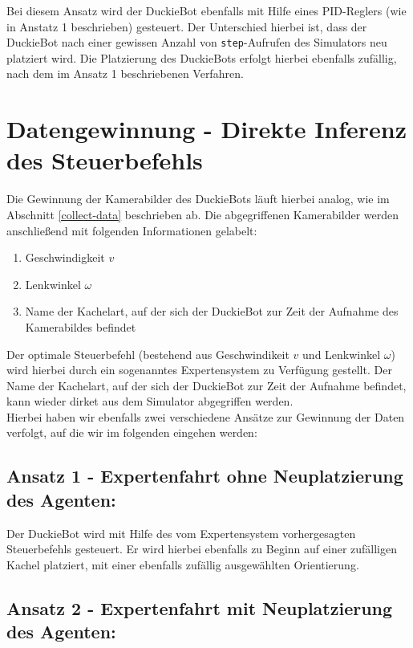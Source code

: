Bei diesem Ansatz wird der DuckieBot ebenfalls mit Hilfe eines PID-Reglers (wie in Anstatz 1 beschrieben) gesteuert. Der Unterschied hierbei ist, dass der DuckieBot nach einer gewissen Anzahl von \texttt{step}-Aufrufen des Simulators neu platziert wird. Die Platzierung des DuckieBots erfolgt hierbei ebenfalls zufällig, nach dem im Ansatz 1 beschriebenen Verfahren.

\section{Datengewinnung - Direkte Inferenz des Steuerbefehls}

Die Gewinnung der Kamerabilder des DuckieBots läuft hierbei analog, wie im Abschnitt \ref{collect-data} beschrieben ab. Die abgegriffenen Kamerabilder werden anschließend mit folgenden Informationen gelabelt:

\begin{enumerate}
	\item Geschwindigkeit $v$
	\item Lenkwinkel $\omega$
	\item Name der Kachelart, auf der sich der DuckieBot zur Zeit der Aufnahme des Kamerabildes befindet
\end{enumerate}


Der optimale Steuerbefehl (bestehend aus Geschwindikeit $v$ und Lenkwinkel $\omega$) wird hierbei durch ein sogenanntes Expertensystem zu Verfügung gestellt. Der Name der Kachelart, auf der sich der DuckieBot zur Zeit der Aufnahme befindet, kann wieder dirket aus dem Simulator abgegriffen werden. \\
Hierbei haben wir ebenfalls zwei verschiedene Ansätze zur Gewinnung der Daten verfolgt, auf die wir im folgenden eingehen werden:

\subsection{Ansatz 1 - Expertenfahrt ohne Neuplatzierung des Agenten:}

Der DuckieBot wird mit Hilfe des vom Expertensystem vorhergesagten Steuerbefehls gesteuert. Er wird hierbei ebenfalls zu Beginn auf einer zufälligen Kachel platziert, mit einer ebenfalls zufällig ausgewählten Orientierung.

\subsection{Ansatz 2 - Expertenfahrt mit Neuplatzierung des Agenten:}

